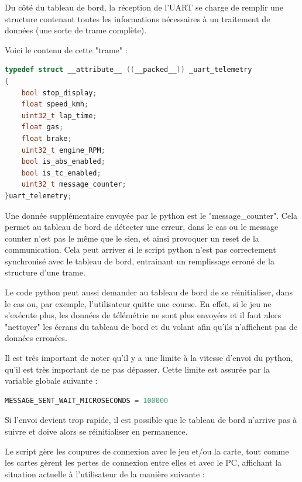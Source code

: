\documentclass[french, 11pt]{article}
\begin{document}
			Du côté du tableau de bord, la réception de l'UART se charge de remplir une structure contenant toutes les informations nécessaires à un traitement de données (une sorte de trame complète).

			Voici le contenu de cette "trame" : 

			\begin{lstlisting}[language=c, caption=Contenu d'une "trame" de données télémétriques côté tableau de bord]
typedef struct __attribute__ ((__packed__)) _uart_telemetry
{
	bool stop_display;
	float speed_kmh;
	uint32_t lap_time;
	float gas;
	float brake;
	uint32_t engine_RPM;
	bool is_abs_enabled;
	bool is_tc_enabled;
	uint32_t message_counter;
}uart_telemetry;
			\end{lstlisting}

		
			Une donnée supplémentaire envoyée par le python est le "message\_counter". Cela permet au tableau de bord de détecter une erreur, dans le cas ou le message counter n'est pas le même que le sien, et ainsi provoquer un reset de la communication. Cela peut arriver si le script python n'est pas correctement synchronisé avec le tableau de bord, entrainant un remplissage erroné de la structure d'une trame.

			Le code python peut aussi demander au tableau de bord de se réinitialiser, dans le cas ou, par exemple, l'utilisateur quitte une course. En effet, si le jeu ne s'exécute plus, les données de télémétrie ne sont plus envoyées et il faut alors "nettoyer" les écrans du tableau de bord et du volant afin qu'ils n'affichent pas de données erronées.


			Il est très important de noter qu'il y a une limite à la vitesse d'envoi du python, qu'il est très important de ne pas dépasser. Cette limite est assurée par la variable globale suivante : 

\begin{lstlisting}[language=python, caption=Variable de ralentissement de l'envoi des données par le python]
MESSAGE_SENT_WAIT_MICROSECONDS = 100000
\end{lstlisting}

		Si l'envoi devient trop rapide, il est possible que le tableau de bord n'arrive pas à suivre et doive alors se réinitialiser en permanence.


		Le script gère les coupures de connexion avec le jeu et/ou la carte, tout comme les cartes gèrent les pertes de connexion entre elles et avec le PC, affichant la situation actuelle à l'utilisateur de la manière suivante :
\end{document}
